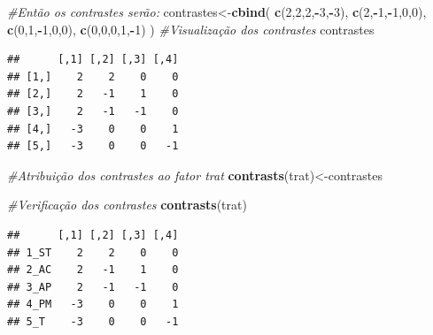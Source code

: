 \documentclass[
]{book}
\newenvironment{Shaded}{\begin{snugshade}}{\end{snugshade}}
\newcommand{\CommentTok}[1]{\textcolor[rgb]{0.56,0.35,0.01}{\textit{#1}}}
\newcommand{\DecValTok}[1]{\textcolor[rgb]{0.00,0.00,0.81}{#1}}
\newcommand{\KeywordTok}[1]{\textcolor[rgb]{0.13,0.29,0.53}{\textbf{#1}}}
\newcommand{\NormalTok}[1]{#1}
\newcommand{\OperatorTok}[1]{\textcolor[rgb]{0.81,0.36,0.00}{\textbf{#1}}}
\begin{document}
\begin{Shaded}
\begin{Highlighting}[]
\CommentTok{#Então os contrastes serão:}
\NormalTok{contrastes<-}\KeywordTok{cbind}\NormalTok{(}
                  \KeywordTok{c}\NormalTok{(}\DecValTok{2}\NormalTok{,}\DecValTok{2}\NormalTok{,}\DecValTok{2}\NormalTok{,}\OperatorTok{-}\DecValTok{3}\NormalTok{,}\OperatorTok{-}\DecValTok{3}\NormalTok{),}
                  \KeywordTok{c}\NormalTok{(}\DecValTok{2}\NormalTok{,}\OperatorTok{-}\DecValTok{1}\NormalTok{,}\OperatorTok{-}\DecValTok{1}\NormalTok{,}\DecValTok{0}\NormalTok{,}\DecValTok{0}\NormalTok{),}
                  \KeywordTok{c}\NormalTok{(}\DecValTok{0}\NormalTok{,}\DecValTok{1}\NormalTok{,}\OperatorTok{-}\DecValTok{1}\NormalTok{,}\DecValTok{0}\NormalTok{,}\DecValTok{0}\NormalTok{),}
                  \KeywordTok{c}\NormalTok{(}\DecValTok{0}\NormalTok{,}\DecValTok{0}\NormalTok{,}\DecValTok{0}\NormalTok{,}\DecValTok{1}\NormalTok{,}\OperatorTok{-}\DecValTok{1}\NormalTok{)}
\NormalTok{                    )}
\CommentTok{#Visualização dos contrastes}
\NormalTok{contrastes}
\end{Highlighting}
\end{Shaded}

\begin{verbatim}
##      [,1] [,2] [,3] [,4]
## [1,]    2    2    0    0
## [2,]    2   -1    1    0
## [3,]    2   -1   -1    0
## [4,]   -3    0    0    1
## [5,]   -3    0    0   -1
\end{verbatim}

\begin{Shaded}
\begin{Highlighting}[]
\CommentTok{#Atribuição dos contrastes ao fator trat}
\KeywordTok{contrasts}\NormalTok{(trat)<-contrastes}

\CommentTok{#Verificação dos contrastes}
\KeywordTok{contrasts}\NormalTok{(trat)}
\end{Highlighting}
\end{Shaded}

\begin{verbatim}
##      [,1] [,2] [,3] [,4]
## 1_ST    2    2    0    0
## 2_AC    2   -1    1    0
## 3_AP    2   -1   -1    0
## 4_PM   -3    0    0    1
## 5_T    -3    0    0   -1
\end{verbatim}
\end{document}
